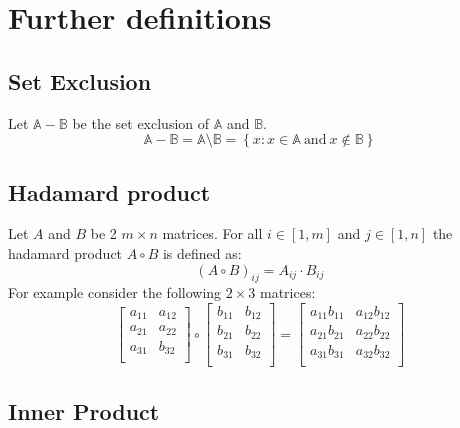 \documentclass[12pt]{article}
\begin{document}
\section{Further definitions}
\subsection{Set Exclusion}
Let \(\mathbb A - \mathbb B\) be the set exclusion of \(\mathbb A\) and \(\mathbb B\).
\begin{equation}\label{eq:defs:SetExclusion}
\mathbb A - \mathbb B = \mathbb A \setminus \mathbb B = \left\{x: x\in\mathbb  A ~\text{and}~ x \notin\mathbb B\right\}
\end{equation}
\subsection{Hadamard product}\label{sec:hadamerd_product}
Let \(A\) and \(B\) be 2 \(m \times n\) matrices. For all \(i \in [1, m]\) and \(j \in [1, n]\)
the hadamard product \(A \circ B\) is defined as:
\begin{equation} \label{eq:defs:Hadamard product}
\left(A \circ B\right)_{ij} = A_{ij} \cdot B_{ij}
\end{equation}
For example consider the following \(2 \times 3\) matrices:
\[
\left[
\begin{array}{ll}
a_{11} & a_{12} \\
a_{21} & a_{22} \\
a_{31} & b_{32} \\
\end{array}
\right] \circ 
\left[
\begin{array}{ll}
b_{11} & b_{12} \\
b_{21} & b_{22} \\
b_{31} & b_{32} \\
\end{array}
\right] = 
\left[
\begin{array}{ll}
a_{11}b_{11} & a_{12}b_{12} \\
a_{21}b_{21} & a_{22}b_{22} \\
a_{31}b_{31} & a_{32}b_{32} \\
\end{array}
\right]
\]

\subsection{Inner Product}
\end{document}
